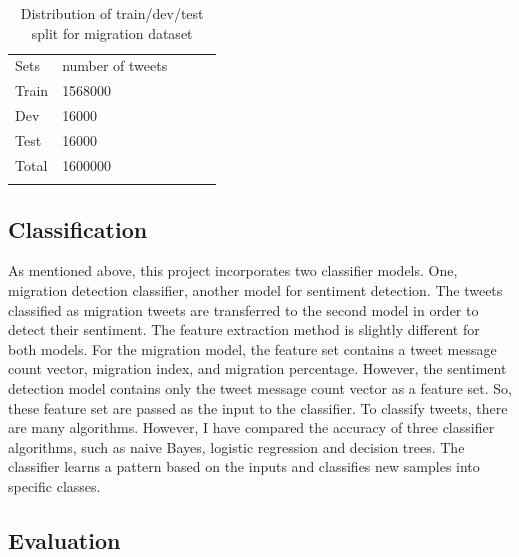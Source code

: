 \begin{table}[]
\centering
\begin{tabular}{lllll}
\cline{1-2}
\multicolumn{1}{|l|}{Sets}   & \multicolumn{1}{l|}{number of tweets} &  &  &  \\ \cline{1-2}
\multicolumn{1}{|l|}{Train} & \multicolumn{1}{l|}{1568000}  &  &  &  \\ \cline{1-2}
\multicolumn{1}{|l|}{Dev} & \multicolumn{1}{l|}{16000 }  &  &  &  \\ \cline{1-2}
\multicolumn{1}{|l|}{Test} & \multicolumn{1}{l|}{16000 }  &  &  &  \\ \cline{1-2}
\multicolumn{1}{|l|}{Total}   & \multicolumn{1}{l|}{1600000}  &  &  &  \\ \cline{1-2}
                            &                           &  &  & 
\label{tab:Distribution of sentiment class}
\end{tabular}
\caption{Distribution of train/dev/test split for migration dataset}
\label{tab:Distsentimentdatset}
\end{table}


\subsection{Classification}
As mentioned above, this project incorporates two classifier models. One, migration detection classifier, another model for sentiment detection. The tweets classified as migration tweets are transferred to the second model in order to detect their sentiment. The feature extraction method is slightly different for both models. For the migration model, the feature set contains a tweet message count vector, migration index, and migration percentage. However, the sentiment detection model contains only the tweet message count vector as a feature set. So, these feature set are passed as the input to the classifier. To classify tweets, there are many algorithms. However, I have compared the accuracy of three classifier algorithms, such as naive Bayes, logistic regression and decision trees. The classifier learns a pattern based on the inputs and classifies new samples into specific classes.



\subsection{Evaluation}

